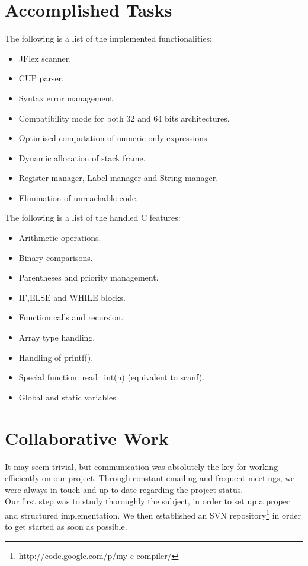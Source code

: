 \documentclass{scrartcl}
\begin{document}
\section{Accomplished Tasks}
The following is a list of the implemented functionalities:
\begin{itemize}
\item JFlex scanner.
\item CUP parser.
\item Syntax error management.
\item Compatibility mode for both 32 and 64 bits architectures.
\item Optimised computation of numeric-only expressions.
\item Dynamic allocation of stack frame.
\item Register manager, Label manager and String manager.
\item Elimination of unreachable code.
\end{itemize}
\vspace{0.5cm}
The following is a list of the handled C features:
\begin{itemize}
\item Arithmetic operations.
\item Binary comparisons.
\item Parentheses and priority management.
\item IF,ELSE and WHILE blocks.
\item Function calls and recursion.
\item Array type handling.
\item Handling of printf().
\item Special function: read\_int(n) (equivalent to scanf).
\item Global and static variables
\end{itemize}


\section{Collaborative Work}
It may seem trivial, but communication was absolutely the key for working efficiently on our project. Through constant emailing and frequent meetings, we were always in touch and up to date regarding the project status.\\
Our first step was to study thoroughly the subject, in order to set up a proper and structured implementation.
We then established an SVN repository\footnote{http://code.google.com/p/my-c-compiler/} in order to get started as soon as possible.
\end{document}
